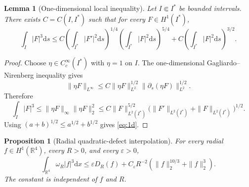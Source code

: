 \documentclass[12pt]{amsart}
\numberwithin{equation}{section}
\newtheorem{proposition}[theorem]{Proposition}
\newtheorem{lemma}[theorem]{Lemma}
\theoremstyle{remark}
\newcommand{\R}{\mathbb{R}}
\newcommand{\dd}{\mathrm{d}x}
\newcommand{\dds}{\mathrm{d}s}
\begin{document}
\begin{lemma}[One-dimensional local inequality]\label{lem:1d}
Let $I\Subset I^*$ be bounded intervals.  There exists $C=C(I,I^*)$ such that for every $F\in H^1(I^*)$,
\begin{equation}\label{eq:1d}
 \int_I|F|^3\dds
 \le C\left(\int_{I^*}|F'|^2\dds\right)^{1/4}
 \left(\int_{I^*}|F|^2\dds\right)^{5/4}
 +C\left(\int_{I^*}|F|^2\dds\right)^{3/2}.
\end{equation}
\end{lemma}

\begin{proof}
Choose $\eta\in C_c^\infty(I^*)$ with $\eta=1$ on $I$.  The one-dimensional Gagliardo--Nirenberg inequality gives
\[
 \|\eta F\|_{L^\infty} \le C\|\eta F\|_{L^2}^{1/2}\|\partial_s(\eta F)\|_{L^2}^{1/2}.
\]
Therefore
\[
 \int_I|F|^3
 \le \|\eta F\|_\infty\|\eta F\|_2^2
 \le C\|F\|_{L^2(I^*)}^{5/2}
 \big(\|F'\|_{L^2(I^*)}+\|F\|_{L^2(I^*)}\big)^{1/2}.
\]
Using $(a+b)^{1/2}\le a^{1/2}+b^{1/2}$ gives \eqref{eq:1d}.
\end{proof}

\begin{proposition}[Radial quadratic-defect interpolation]\label{prop:weighted}
For every radial $f\in H^1(\R^4)$, every $R>0$, and every $\varepsilon>0$,
\begin{equation}\label{eq:weighted-main}
 \int_{\R^4}\omega_R|f|^3\dd
 \le \varepsilon D_R(f) +C_\varepsilon R^{-2}\left(\|f\|_2^{10/3}+\|f\|_2^3\right).
\end{equation}
The constant is independent of $f$ and $R$.
\end{proposition}
\end{document}
